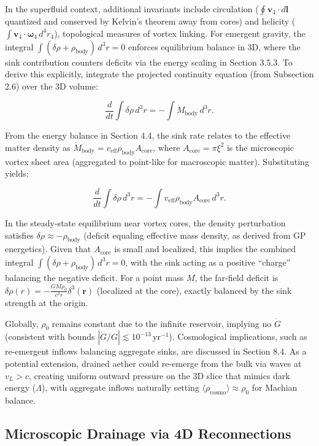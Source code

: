 \documentclass{article}
\begin{document}
In the superfluid context, additional invariants include circulation ($\oint \mathbf{v}_4 \cdot d\mathbf{l}$ quantized and conserved by Kelvin's theorem away from cores) and helicity ($\int \mathbf{v}_4 \cdot \boldsymbol{\omega}_4 \, d^4 r_4$), topological measures of vortex linking. For emergent gravity, the integral $\int (\delta\rho + \rho_{\text{body}}) \, d^3 r = 0$ enforces equilibrium balance in 3D, where the sink contribution counters deficits via the energy scaling in Section 3.5.3. To derive this explicitly, integrate the projected continuity equation (from Subsection 2.6) over the 3D volume:

\[
\frac{d}{dt} \int \delta\rho \, d^3 r = - \int \dot{M}_{\text{body}} \, d^3 r.
\]

From the energy balance in Section 4.4, the sink rate relates to the effective matter density as $\dot{M}_{\text{body}} = v_{\text{eff}} \rho_{\text{body}} A_{\text{core}}$, where $A_{\text{core}} = \pi \xi^2$ is the microscopic vortex sheet area (aggregated to point-like for macroscopic matter). Substituting yields:

\[
\frac{d}{dt} \int \delta\rho \, d^3 r = - \int v_{\text{eff}} \rho_{\text{body}} A_{\text{core}} \, d^3 r.
\]

In the steady-state equilibrium near vortex cores, the density perturbation satisfies $\delta\rho \approx - \rho_{\text{body}}$ (deficit equaling effective mass density, as derived from GP energetics). Given that $A_{\text{core}}$ is small and localized, this implies the combined integral $\int (\delta\rho + \rho_{\text{body}}) \, d^3 r = 0$, with the sink acting as a positive ``charge'' balancing the negative deficit. For a point mass $M$, the far-field deficit is $\delta\rho(r) = - \frac{G M \rho_0}{c^2 r} \delta^3(\mathbf{r})$ (localized at the core), exactly balanced by the sink strength at the origin.

Globally, $\rho_0$ remains constant due to the infinite reservoir, implying no $\dot{G}$ (consistent with bounds $|\dot{G}/G| \lesssim 10^{-13} \, \mathrm{yr}^{-1}$). Cosmological implications, such as re-emergent inflows balancing aggregate sinks, are discussed in Section 8.4. As a potential extension, drained aether could re-emerge from the bulk via waves at $v_L > c$, creating uniform outward pressure on the 3D slice that mimics dark energy ($\Lambda$), with aggregate inflows naturally setting $\langle \rho_{\text{cosmo}} \rangle \approx \rho_0$ for Machian balance.

\subsection{Microscopic Drainage via 4D Reconnections}
\end{document}
